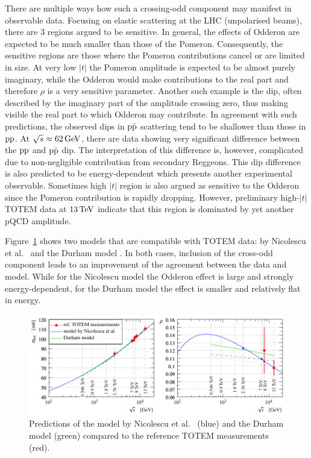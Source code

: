 There are multiple ways how such a crossing-odd component may manifest in observable data. Focusing on elastic scattering at the LHC (unpolarised beams), there are 3 regions argued to be sensitive. In general, the effects of Odderon are expected to be much smaller than those of the Pomeron. Consequently, the sensitive regions are those where the Pomeron contributions cancel or are limited in size. At very low $|t|$ the Pomeron amplitude is expected to be almost purely imaginary, while the Odderon would make contributions to the real part and therefore $\rho$ is a very sensitive parameter. Another such example is the dip, often described by the imaginary part of the amplitude crossing zero, thus making visible the real part to which Odderon may contribute. In agreement with such predictions, the observed dips in $\rm p\bar p$ scattering tend to be shallower than those in $\rm pp$. At $\sqrt s \approx 62\,{\rm GeV}$, there are data showing very significant difference between the $\rm pp$ and $\rm p\bar p$ dip. The interpretation of this difference is, however, complicated due to non-negligible contribution from secondary Reggeons. This dip difference is also predicted to be energy-dependent which presents another experimental observable. Sometimes high $|t|$ region is also argued as sensitive to the Odderon since the Pomeron contribution is rapidly dropping. However, preliminary high-$|t|$ TOTEM data at $13\,{\rm TeV}$ indicate that this region is dominated by yet another pQCD amplitude.

Figure~\ref{fig:match models} shows two models that are compatible with TOTEM data: by Nicolescu et al.~\cite{nicolescu-2017} and the Durham model \cite{durham-2017-note}. In both cases, inclusion of the cross-odd component leads to an improvement of the agreement between the data and model. While for the Nicolescu model the Odderon effect is large and strongly energy-dependent, for the Durham model the effect is smaller and relatively flat in energy.

\begin{figure}
\vskip-5mm
\begin{center}
\includegraphics{fig/matching_models_si_tot_rho.pdf}
\caption{%
Predictions of the model by Nicolescu et al.~\cite{nicolescu-2017} (blue) and the Durham model \cite{durham-2017-note} (green) compared to the reference TOTEM measurements (red). 
}
\label{fig:match models}
\end{center}
\end{figure}
